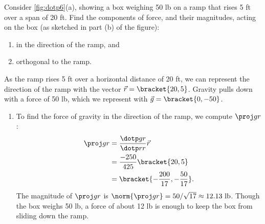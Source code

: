 \begin{example}\label{ex_dotp6}
Consider \autoref{fig:dotp6}(a), showing a box weighing 50 lb on a ramp that rises 5 ft over a span of 20 ft. Find the components of force, and their magnitudes, acting on the box (as sketched in part (b) of the figure):
\begin{enumerate}
	\item in the direction of the ramp, and
	\item	orthogonal to the ramp.
\end{enumerate}
%
\solution
As the ramp rises 5 ft over a horizontal distance of 20 ft, we can represent the direction of the ramp with the vector $\vec r=\bracket{20,5}$. Gravity pulls down with a force of 50 lb, which we represent with $\vec g =\bracket{0,-50}$. 
\begin{enumerate}
	\item To find the force of gravity in the direction of the ramp, we compute $\proj gr$:
	\begin{align*}
	\proj gr &= \frac{\dotp gr}{\dotp rr}\vec r\\
	&=  \frac{-250}{425}\bracket{20,5}\\
	&=\bracket{-\frac{200}{17},-\frac{50}{17}}%
	.
	\end{align*}
	The magnitude of $\proj gr$ is $\norm{\proj gr} = 50/\sqrt{17} \approx 12.13\text{ lb}$. Though the box weighs 50 lb, a force of about 12 lb is enough to keep the box from sliding down the ramp.
	

\end{enumerate}
\end{example}
